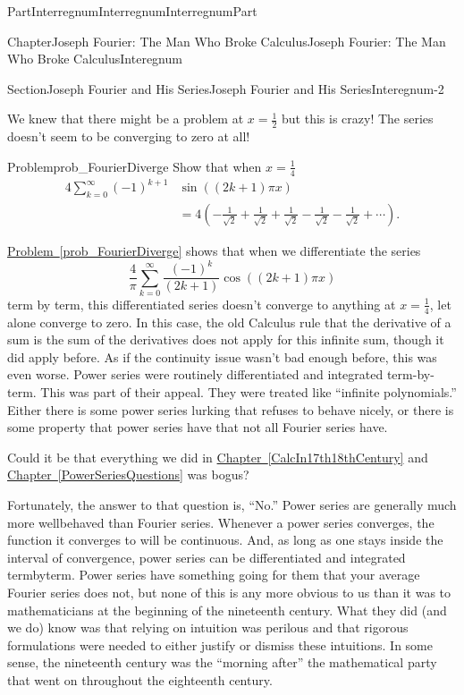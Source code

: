 \documentclass[oneside,10pt,]{book}
\newcommand{\xreffont}{\relax}
\numberwithin{equation}{part}
\newcommand{\amp}{&}
\begin{document}
\begin{partptx}{Part}{Interregnum}{}{Interregnum}{}{}{InterregnumPart}
\begin{chapterptx}{Chapter}{Joseph Fourier: The Man Who Broke Calculus}{}{Joseph Fourier: The Man Who Broke Calculus}{}{}{Interegnum}
\begin{sectionptx}{Section}{Joseph Fourier and His Series}{}{Joseph Fourier and His Series}{}{}{Interegnum-2}
\begin{image}{0.125}{0.75}{0.125}{}
\end{image}%
We knew that there might be a problem at \(x=\frac{1}{2}\) but this is crazy! The series doesn't seem to be converging to zero at all!%
\begin{problem}{Problem}{}{prob_FourierDiverge}%
Show that when \(x=\frac{1}{4}\)%
\begin{align*}
4\sum_{k=0}^\infty\left(-1\right)^{k+1}\amp{} \sin\left(\left(2k+1\right)\pi x\right)\\
\amp{}=4\left(-\frac{1}{\sqrt{2}}+\frac{1}{\sqrt{2}}+\frac{1}{\sqrt{2}}- \frac{1}{\sqrt{2}}-\frac{1}{\sqrt{2}}+\cdots\right).
\end{align*}
%
\end{problem}
\hyperref[prob_FourierDiverge]{Problem~{\xreffont\ref{prob_FourierDiverge}}} shows that when we differentiate the series%
\begin{equation*}
\frac{4}{\pi}\sum_{k=0}^\infty\frac{\left(-1\right)^k}{\left(2k+1\right)} \cos\left(\left(2k+1\right)\pi x\right)
\end{equation*}
term by term, this differentiated series doesn't converge to anything at \(x=\frac{1}{4}\), let alone converge to zero. In this case, the old Calculus rule that the derivative of a sum is the sum of the derivatives does not apply for this infinite sum, though it did apply before. As if the continuity issue wasn't bad enough before, this was even worse. Power series were routinely differentiated and integrated term-by-term. This was part of their appeal. They were treated like ``infinite polynomials.'' Either there is some power series lurking that refuses to behave nicely, or there is some property that power series have that not all Fourier series have.%
\par
Could it be that everything we did in \hyperref[CalcIn17th18thCentury]{Chapter~{\xreffont\ref{CalcIn17th18thCentury}}} and \hyperref[PowerSeriesQuestions]{Chapter~{\xreffont\ref{PowerSeriesQuestions}}} was bogus?%
\par
Fortunately, the answer to that question is, ``No.'' Power series are generally much more well\textendash{}behaved than Fourier series.  Whenever a power series converges, the function it converges to will be continuous.  And, as long as one stays inside the interval of convergence, power series can be differentiated and integrated term\textendash{}by\textendash{}term. Power series have something going for them that your average Fourier series does not, but none of this is any more obvious to us than it was to mathematicians at the beginning of the nineteenth century.  What they did (and we do) know was that relying on intuition was perilous and that rigorous formulations were needed to either justify or dismiss these intuitions.  In some sense, the nineteenth century was the ``morning after'' the mathematical party that went on throughout the eighteenth century.%

\end{sectionptx}
\end{chapterptx}
\end{partptx}
\end{document}

